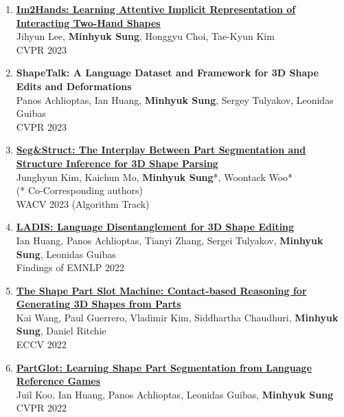 \documentclass[letterpaper,10pt]{article} %
\newcommand{\blankline}{\quad\pagebreak[2]}
\begin{document}
{\begin{enumerate}
\item \label{cvpr23_2}
\href{https://arxiv.org/abs/2302.14348}{\textbf{Im2Hands: Learning Attentive Implicit Representation of Interacting Two-Hand Shapes}}\\
Jihyun Lee, \textbf{Minhyuk Sung}, Honggyu Choi, Tae-Kyun Kim\\
CVPR 2023\\
\blankline

\item \label{cvpr23_1}
\textbf{ShapeTalk: A Language Dataset and Framework for 3D Shape Edits and Deformations}\\
Panos Achlioptas, Ian Huang, \textbf{Minhyuk Sung}, Sergey Tulyakov, Leonidas Guibas\\
CVPR 2023\\
\blankline

\item \label{wacv23}
\href{https://arxiv.org/abs/2212.05011}{\textbf{Seg\&Struct: The Interplay Between Part Segmentation and Structure Inference for 3D Shape Parsing}}\\
Junghyun Kim, Kaichun Mo, \textbf{Minhyuk Sung}*, Woontack Woo*\\
(* Co-Corresponding authors)\\
WACV 2023 (Algorithm Track)\\
\blankline

\item \label{emnlp22}
\href{https://arxiv.org/abs/2212.05011}{\textbf{LADIS: Language Disentanglement for 3D Shape Editing}}\\
Ian Huang, Panos Achlioptas, Tianyi Zhang, Sergei Tulyakov, \textbf{Minhyuk Sung}, Leonidas Guibas \\
Findings of EMNLP 2022\\
\blankline

\item \label{eccv22}
\href{https://arxiv.org/abs/2112.00584}{\textbf{The Shape Part Slot Machine: Contact-based Reasoning for Generating 3D Shapes from Parts}}\\
Kai Wang, Paul Guerrero, Vladimir Kim, Siddhartha Chaudhuri, \textbf{Minhyuk Sung}, Daniel Ritchie\\
ECCV 2022\\
\blankline

\item \label{cvpr22_2}
\href{https://arxiv.org/abs/2112.06390}{\textbf{PartGlot: Learning Shape Part Segmentation from Language Reference Games}}\\
Juil Koo, Ian Huang, Panos Achlioptas, Leonidas Guibas, \textbf{Minhyuk Sung}\\
CVPR 2022\\
\blankline


\end{enumerate}}
\end{document}
